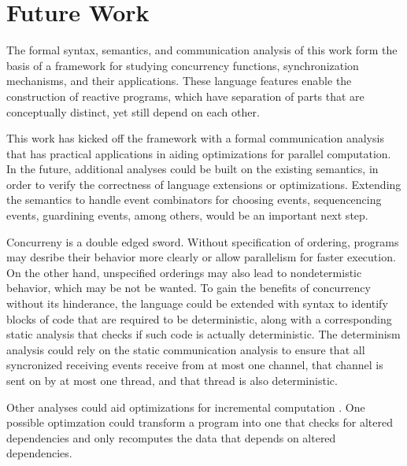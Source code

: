 \documentclass[letterpaper, 11pt]{extarticle}
\begin{document}
\section{Future Work}
The formal syntax, semantics, and communication analysis of this work form the basis of
a framework for studying concurrency functions, synchronization mechanisms, and their
applications. These language features enable the construction of reactive programs, which
have separation of parts that are conceptually distinct, yet still depend on each
other.

This work has kicked off the framework with a formal communication analysis that has practical
applications in aiding optimizations for parallel computation.  In the future, additional
analyses could be built on the existing semantics, in order to verify the correctness of language 
extensions or optimizations. Extending the semantics to handle event combinators for choosing
events, sequencencing events, guardining events, among others, would be an important next step.

Concurreny is a double edged sword. Without specification of ordering, programs may
desribe their behavior more clearly or allow parallelism for faster execution. On the other hand,
unspecified orderings may also lead to nondetermistic behavior, which may be not be wanted. 
To gain the benefits of concurrency without its hinderance, the language could be extended
with syntax to identify blocks of code that are required to be deterministic,
along with a corresponding static analysis that checks if such code is actually
deterministic. The determinism analysis could rely on the static communication analysis
to ensure that all syncronized receiving events receive from at most one channel,
that channel is sent on by at most one thread, and that thread is also deterministic.

Other analyses could aid optimizations for incremental computation
\cite{acar2002adaptive}. One possible optimzation could transform a program into one
that checks for altered dependencies and only recomputes the data that depends on altered dependencies.

\newpage



\end{document}
